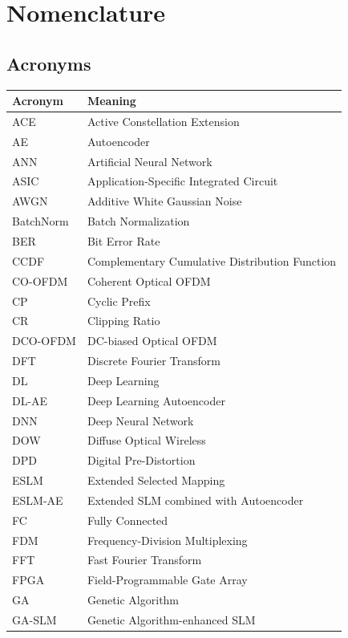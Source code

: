 \chapter*{Nomenclature}
\label{ch:nomenclature}

\section*{Acronyms}

\begin{center}
\begin{tabular}{l l}
\toprule
    \textbf{Acronym} & \textbf{Meaning} \\
\midrule
ACE & Active Constellation Extension \\
AE & Autoencoder \\
ANN & Artificial Neural Network \\
ASIC & Application-Specific Integrated Circuit \\
AWGN & Additive White Gaussian Noise \\
BatchNorm & Batch Normalization \\
BER & Bit Error Rate \\
CCDF & Complementary Cumulative Distribution Function \\
CO-OFDM & Coherent Optical OFDM \\
CP & Cyclic Prefix \\
CR & Clipping Ratio \\
DCO-OFDM & DC-biased Optical OFDM \\
DFT & Discrete Fourier Transform \\
DL & Deep Learning \\
DL-AE & Deep Learning Autoencoder \\
DNN & Deep Neural Network \\
DOW & Diffuse Optical Wireless \\
DPD & Digital Pre-Distortion \\
ESLM & Extended Selected Mapping \\
ESLM-AE & Extended SLM combined with Autoencoder \\
FC & Fully Connected \\
FDM & Frequency-Division Multiplexing \\
FFT & Fast Fourier Transform \\
FPGA & Field-Programmable Gate Array \\
GA & Genetic Algorithm \\
GA-SLM & Genetic Algorithm-enhanced SLM \\
\bottomrule
\end{tabular}


\end{center}
